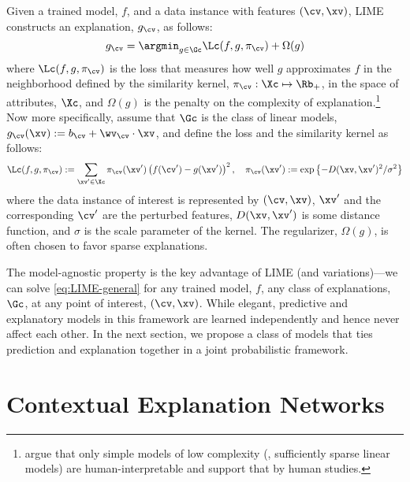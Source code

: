 \documentclass[twoside,11pt]{article}
\begin{document}
Given a trained model, $f$, and a data instance with features $(\cv, \xv)$, LIME constructs an explanation, $g_{\cv}$, as follows:
\begin{equation}
    \label{eq:LIME-general}
    g_{\cv} = \argmin_{g \in \Gc} \Lc(f, g, \pi_{\cv}) + \Omega(g)
\end{equation}
where $\Lc(f, g, \pi_{\cv})$ is the loss that measures how well $g$ approximates $f$ in the neighborhood defined by the similarity kernel, $\pi_{\cv} : \Xc \mapsto \Rb_+$, in the space of attributes, $\Xc$, and $\Omega(g)$ is the penalty on the complexity of explanation.\footnote{\citet{ribeiro2016trust} argue that only simple models of low complexity (\eg, sufficiently sparse linear models) are human-interpretable and support that by human studies.}
Now more specifically, \citet{ribeiro2016trust} assume that $\Gc$ is the class of linear models, $g_{\cv}(\xv) := b_{\cv} + \wv_{\cv} \cdot \xv$, and define the loss and the similarity kernel as follows:
\begin{equation}
    \label{eq:LIME-specific}
    \Lc(f, g, \pi_{\cv}) := \sum_{\xv^\prime \in \Xc} \pi_{\cv}(\xv^\prime)\left(f(\cv^\prime) - g(\xv^\prime)\right)^2, \quad
    \pi_{\cv}(\xv^\prime) := \exp\left\{-D(\xv, \xv^\prime)^2 / \sigma^2\right\}
\end{equation}
where the data instance of interest is represented by $(\cv, \xv)$, $\xv^\prime$ and the corresponding $\cv^\prime$ are the perturbed features, $D(\xv, \xv^\prime)$ is some distance function, and $\sigma$ is the scale parameter of the kernel.
The regularizer, $\Omega(g)$, is often chosen to favor sparse explanations.

The model-agnostic property is the key advantage of LIME (and variations)---we can solve \eqref{eq:LIME-general} for any trained model, $f$, any class of explanations, $\Gc$, at any point of interest, $(\cv, \xv)$.
While elegant, predictive and explanatory models in this framework are learned independently and hence never affect each other.
In the next section, we propose a class of models that ties prediction and explanation together in a joint probabilistic framework.
 
\section{Contextual Explanation Networks}
\label{sec:CEN}
\end{document}
